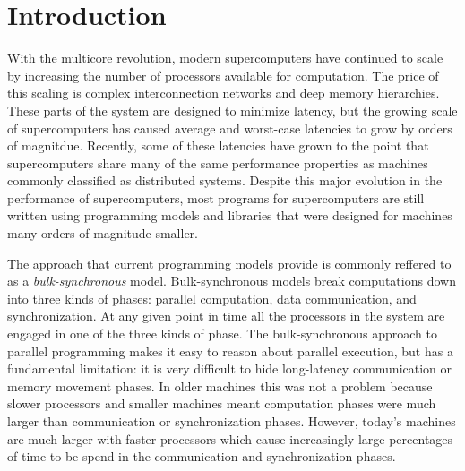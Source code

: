 
\section{Introduction}
\label{sec:intro}





With the multicore revolution, modern supercomputers have continued to scale
by increasing the number of processors available for computation.  The
price of this scaling is complex interconnection networks and
deep memory hierarchies.  These parts of the system are designed to
minimize latency, but the growing scale of supercomputers has
caused average and worst-case latencies to grow by orders of magnitdue.
Recently, some of these latencies have grown to the point that supercomputers
share many of the same performance properties as machines commonly
classified as distributed systems.  Despite this major evolution in the
performance of supercomputers, most programs for supercomputers are still
written using programming models and libraries that were designed
for machines many orders of magnitude smaller\cite{MPI,COARRAY_FORTRAN,UPC99}.  

The approach that current programming models provide is commonly reffered to
as a {\em bulk-synchronous} model\cite{Valiant90}.  Bulk-synchronous models
break computations down into three kinds of phases: parallel computation, data
communication, and synchronization.  At any given point in time all the processors
in the system are engaged in one of the three kinds of phase.  The bulk-synchronous
approach to parallel programming makes it easy to reason about parallel execution, but
has a fundamental limitation: it is very difficult to hide long-latency communication
or memory movement phases.  In older machines this was not a problem because slower
processors and smaller machines meant computation phases were much larger than
communication or synchronization phases.  However, today's machines are much
larger with faster processors which cause increasingly large percentages of time
to be spend in the communication and synchronization phases.

